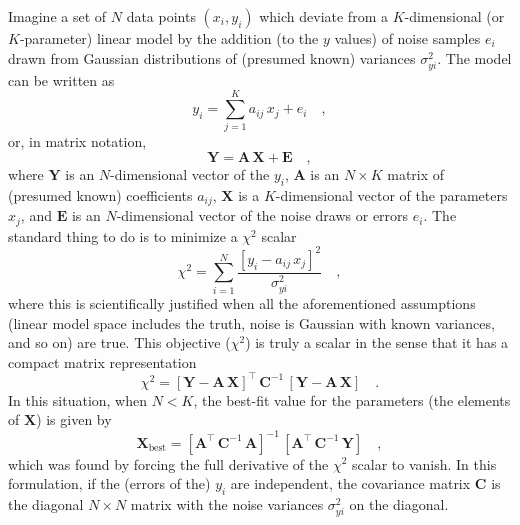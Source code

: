 \documentclass[12pt,twoside]{article}
\newcommand{\mmatrix}[1]{\boldsymbol{#1}}
\newcommand{\inverse}[1]{{#1}^{-1}}
\newcommand{\transpose}[1]{{#1}^{\scriptscriptstyle \top}}
\newcommand{\mA}{\mmatrix{A}}
\newcommand{\mAT}{\transpose{\mA}}
\newcommand{\mC}{\mmatrix{C}}
\newcommand{\mCinv}{\inverse{\mC}}
\newcommand{\mE}{\mmatrix{E}}
\newcommand{\mX}{\mmatrix{X}}
\newcommand{\mY}{\mmatrix{Y}}
\newcommand{\best}{\mathrm{best}}
\begin{document}
Imagine a set of $N$ data points $(x_i,y_i)$ which deviate from a
$K$-dimensional (or $K$-parameter) linear model by the addition (to
the $y$ values) of noise samples $e_i$ drawn from Gaussian
distributions of (presumed known) variances $\sigma_{yi}^2$.  The
model can be written as
\begin{equation}
y_i = \sum_{j=1}^K
  a_{ij}\,x_j + e_i
  \quad ,
\end{equation}
or, in matrix notation,
\begin{equation}
\mY = \mA\,\mX + \mE
  \quad ,
\end{equation}
where $\mY$ is an $N$-dimensional vector of the $y_i$, $\mA$ is an
$N\times K$ matrix of (presumed known) coefficients $a_{ij}$, $\mX$ is
a $K$-dimensional vector of the parameters $x_j$, and $\mE$ is an
$N$-dimensional vector of the noise draws or errors $e_i$.  The
standard thing to do is to minimize a $\chi^2$ scalar
\begin{equation}
\chi^2 = \sum_{i=1}^N
  \frac{\left[y_i - a_{ij}\,x_j\right]^2}{\sigma_{yi}^2}
  \quad ,
\end{equation}
where this is scientifically justified when all the aforementioned
assumptions (linear model space includes the truth, noise is Gaussian
with known variances, and so on) are true.  This objective ($\chi^2$)
is truly a scalar in the sense that it has a compact matrix
representation
\begin{equation}
\chi^2 = \transpose{\left[\mY-\mA\,\mX\right]}
  \,\mCinv\,\left[\mY-\mA\,\mX\right]
  \quad .
\end{equation}
In this situation, when $N<K$, the best-fit value for the parameters
(the elements of $\mX$) is given by
\begin{equation}
\mX_\best = \inverse{\left[\mAT\,\mCinv\,\mA\right]}
  \,\left[\mAT\,\mCinv\,\mY\right]
  \quad ,
\end{equation}
which was found by forcing the full derivative of the $\chi^2$ scalar
to vanish.  In this formulation, if the (errors of the) $y_i$ are
independent, the covariance matrix $\mC$ is the diagonal $N\times N$
matrix with the noise variances $\sigma_{yi}^2$ on the diagonal.
\end{document}
